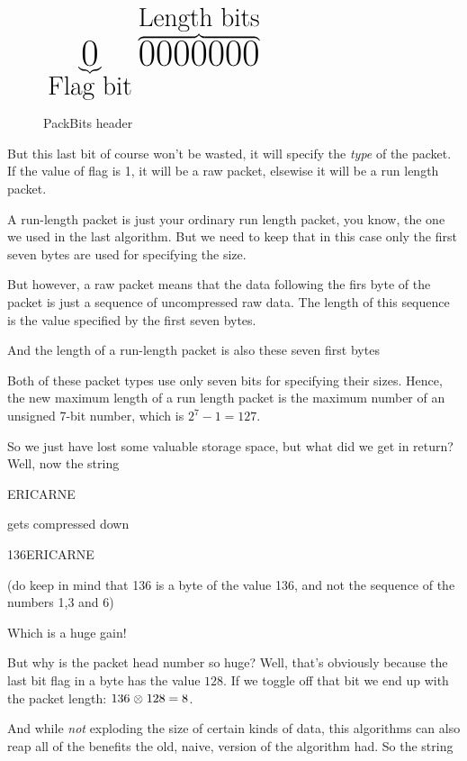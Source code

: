 \begin{refsection}
\begin{figure}[h!]
  \centering
  $\mbox{\fontsize{30}{0} $\underbrace{0}_\text{Flag bit}\overbrace{0000000}^\text{Length bits}$}$
  \caption{PackBits header}
  \label{fig:packbits-header}
\end{figure}

But this last bit of course won't be wasted, it will specify the
\textit{type} of the packet. If the value of flag is 1, it will be a
raw packet, elsewise it will be a run length packet.

A run-length packet is just your ordinary run length packet, you know,
the one we used in the last algorithm. But we need to keep that in
this case only the first seven bytes are used for specifying the size.

But however, a raw packet means that the data following the firs byte
of the packet is just a sequence of uncompressed raw data. The length
of this sequence is the value specified by the first seven bytes.

And the length of a run-length packet is also these seven first
bytes

Both of these packet types use only seven bits for specifying their
sizes. Hence, the new maximum length of a run length packet is the
maximum number of an unsigned 7-bit number, which is $2^7 -1 = 127$.

So we just have lost some valuable storage space, but what did we get in
return? Well, now the string

\begin{indentpar}
  ERICARNE
\end{indentpar}

gets compressed down

\begin{indentpar}
  136ERICARNE
\end{indentpar}

(do keep in mind that 136 is a byte of the value 136, and not the
sequence of the numbers 1,3 and 6)

Which is a huge gain!

But why is the packet head number so huge? Well, that's obviously
because the last bit flag in a byte has the value $128$. If we toggle
off that bit we end up with the packet length: $136 \mathrel{\otimes} 128 = 8$.

And while \textit{not} exploding the size of certain kinds of data,
this algorithms can also reap all of the benefits the old, naive, version
of the algorithm had. So the string


\end{refsection}
